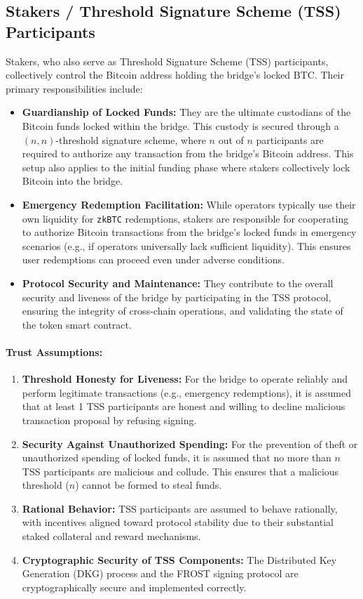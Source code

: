 \documentclass{DESSThesis}
\newcommand{\zktoken}{\texttt{zkBTC}}
\begin{document}
\subsection{Stakers / Threshold Signature Scheme (TSS) Participants}
Stakers, who also serve as Threshold Signature Scheme (TSS) participants, collectively control the Bitcoin address holding the bridge's locked BTC. Their primary responsibilities include:
\begin{itemize}
        \item \textbf{Guardianship of Locked Funds:} They are the ultimate custodians of the Bitcoin funds locked within the bridge. This custody is secured through a $(n, n)$-threshold signature scheme, where $n$ out of $n$ participants are required to authorize any transaction from the bridge's Bitcoin address. This setup also applies to the initial funding phase where stakers collectively lock Bitcoin into the bridge.
        \item \textbf{Emergency Redemption Facilitation:} While operators typically use their own liquidity for \texttt{\zktoken} redemptions, stakers are responsible for cooperating to authorize Bitcoin transactions from the bridge's locked funds in emergency scenarios (e.g., if operators universally lack sufficient liquidity). This ensures user redemptions can proceed even under adverse conditions.
        \item \textbf{Protocol Security and Maintenance:} They contribute to the overall security and liveness of the bridge by participating in the TSS protocol, ensuring the integrity of cross-chain operations, and validating the state of the token smart contract.
\end{itemize}

\paragraph{Trust Assumptions:}
    \begin{enumerate}
        \item \textbf{Threshold Honesty for Liveness:} For the bridge to operate reliably and perform legitimate transactions (e.g., emergency redemptions), it is assumed that at least 1 TSS participants are honest and willing to decline malicious transaction proposal by refusing signing.
        \item \textbf{Security Against Unauthorized Spending:} For the prevention of theft or unauthorized spending of locked funds, it is assumed that no more than $n$ TSS participants are malicious and collude. This ensures that a malicious threshold ($n$) cannot be formed to steal funds.
        \item \textbf{Rational Behavior:} TSS participants are assumed to behave rationally, with incentives aligned toward protocol stability due to their substantial staked collateral and reward mechanisms.
        \item \textbf{Cryptographic Security of TSS Components:} The Distributed Key Generation (DKG) process and the FROST signing protocol are cryptographically secure and implemented correctly.
    \end{enumerate}
\end{document}
